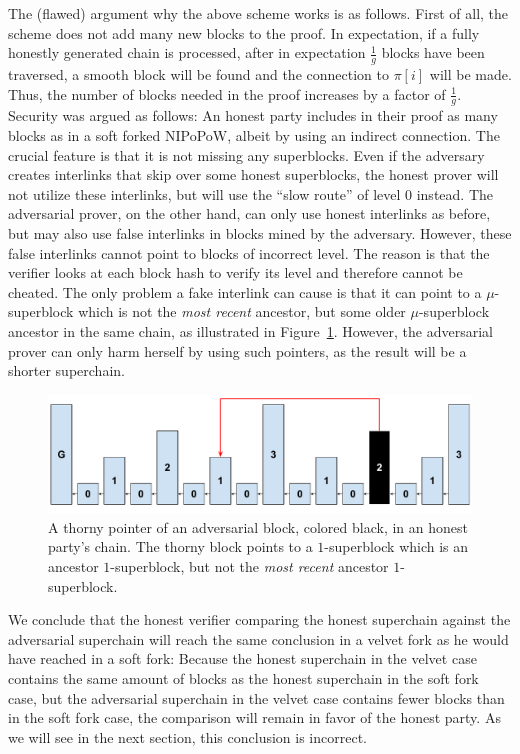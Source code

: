 The (flawed) argument   why the above scheme works is as follows. First of all, the
scheme does not add many new blocks to the proof. In expectation, if a fully
honestly generated chain is processed, after in expectation $\frac{1}{g}$ blocks
have been traversed, a smooth block will be found and the connection to $\pi[i]$
will be made. Thus, the number of blocks needed in the proof increases by a
factor of $\frac{1}{g}$. Security was argued as follows: An honest party
includes in their proof as many blocks as in a soft forked NIPoPoW, albeit by
using an indirect connection. The crucial feature is that it is not missing any
superblocks. Even if the adversary creates interlinks that skip over some honest
superblocks, the honest prover will not utilize these interlinks, but will use
the ``slow route'' of level $0$ instead. The adversarial prover, on the other
hand, can only use honest interlinks as before, but may also use false
interlinks in blocks mined by the adversary. However, these false
interlinks cannot point to blocks of incorrect level. The reason is
that the verifier looks at each block hash to verify its level and
therefore cannot be cheated. The only problem a fake interlink can cause is that
it can point to a $\mu$-superblock which is not the \emph{most recent} ancestor,
but some older $\mu$-superblock ancestor in the same chain,
as illustrated in Figure~\ref{fig:skip_ancestor}. However, the adversarial
prover can only harm herself by using such pointers, as the result will
be a shorter superchain.

\begin{figure}
	\begin{center}
		\includegraphics[width=0.8\columnwidth]{figures/simple_thorny.pdf}
	\end{center}
    \caption{A thorny pointer of an adversarial block, colored black, in an honest party's chain. The thorny block points to a $1$-superblock which is an ancestor
		$1$-superblock, but not the \emph{most recent} ancestor $1$-superblock.}
	\label{fig:skip_ancestor}
\end{figure}

We conclude that the honest verifier comparing the honest superchain
against the adversarial superchain will reach the same conclusion in a velvet
fork as he would have reached in a soft fork: Because the honest
superchain in the velvet case contains the same amount of blocks as the honest
superchain in the soft fork case, but the adversarial superchain in the velvet
case contains fewer blocks than in the soft fork case, the comparison will
remain in favor of the honest party. As we will see in the next section, this
conclusion is incorrect.
